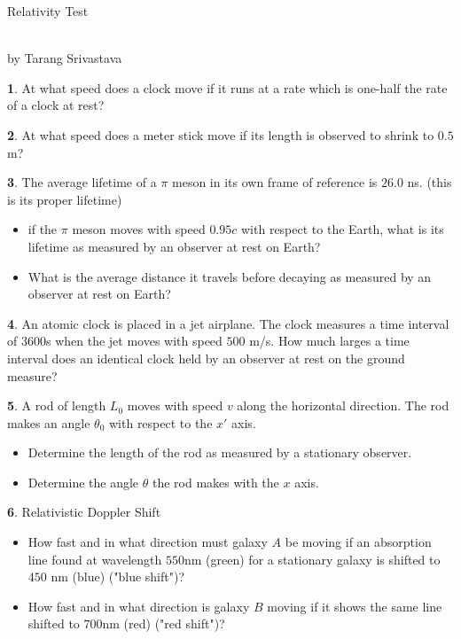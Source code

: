 \documentclass[10pt, twocolumn]{article}
\author{Tarang Srivastava}
\newcommand{\makechaptertitle}[1]{
\begin{center}
	\begin{large}
		#1
	\end{large}
	\begin{small}
		\\by Tarang Srivastava
	\end{small}
\end{center}
}
\theoremstyle{definition}
\newtheorem{q}{}
\begin{document}
		\makechaptertitle{Relativity Test}
		\begin{q}
			At what speed does a clock move if it runs at a rate which is one-half the rate of a clock at rest?
		\end{q}
		\begin{q}
			At what speed does a meter stick move if its length is observed to shrink to $ 0.5 $ m?
		\end{q}
		\begin{q}
			The average lifetime of a $ \pi $ meson in its own frame of reference is $ 26.0 $ ns. (this is its proper lifetime)
			\begin{itemize}
				\item if the $ \pi $ meson moves with speed $ 0.95 c $ with respect to the Earth, what is its lifetime as measured by an observer at rest on Earth?
				\item What is the average distance it travels before decaying as measured by an observer at rest on Earth?
			\end{itemize}
		\end{q}
		\begin{q}
			An atomic clock is placed in a jet airplane. The clock measures a time interval of $ 3600 $s when the jet moves with speed $ 500 $ m/s. How much larges a time interval does an identical clock held by an observer at rest on the ground measure?
		\end{q}
		\begin{q}
			A rod of length $ L_0 $ moves with speed $ v $ along the horizontal direction. The rod makes an angle $ \theta_0 $ with respect to the $ x' $ axis. 
			\begin{itemize}
				\item Determine the length of the rod as measured by a stationary observer.
				\item Determine the angle $ \theta $ the rod makes with the $ x $ axis.
			\end{itemize}
		\end{q}
		\begin{q}
			Relativistic Doppler Shift 
			\begin{itemize}
				\item How fast and in what direction must galaxy $ A $ be moving if an absorption line found at wavelength $ 550 $nm (green) for a stationary galaxy is shifted to $ 450 $ nm (blue) ("blue shift")?
				\item How fast and in what direction is galaxy $ B $ moving if it shows the same line shifted to $ 700 $nm (red) ("red shift")?
			\end{itemize}
		\end{q}
\end{document}
